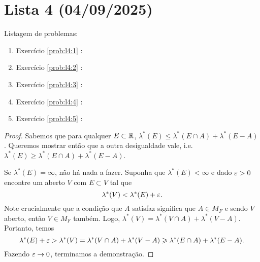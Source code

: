 \section{Lista 4 (04/09/2025)}

Listagem de problemas:
\begin{enumerate}
    \item Exercício \ref{prob:l4:1} : \checkmark
    \item Exercício \ref{prob:l4:2} : \Frowny
    \item Exercício \ref{prob:l4:3} : \Frowny
    \item Exercício \ref{prob:l4:4} : \Frowny
    \item Exercício \ref{prob:l4:5} : \Frowny
\end{enumerate}

\begin{problem}
    \label{prob:l4:1}
\end{problem}
\begin{proof}
    Sabemos que para qualquer $E \subset \mathbb{R}$, $\lambda^*(E) \leq \lambda^*(E \cap A) + \lambda^*(E - A)$.
    Queremos mostrar então que a outra desigualdade vale, i.e. $\lambda^*(E) \geq \lambda^*(E \cap A) + \lambda^*(E - A)$.
    
    Se $\lambda^*(E) = \infty$, não há nada a fazer. Suponha que $\lambda^*(E) < \infty$ e dado $\varepsilon > 0$
    encontre um aberto $V$ com $E \subset V$ tal que 
    $$\lambda^*(V) < \lambda^*(E) + \varepsilon .$$
    Note crucialmente que a condição que $A$ satisfaz significa que $A \in M_F$
    e sendo $V$ aberto, então $V \in M_F$ também. Logo, $\lambda^*(V) = \lambda^*(V \cap A) + \lambda^*(V - A)$.
    Portanto, temos 
    $$\lambda^*(E) + \varepsilon > \lambda^*(V) = \lambda^*(V \cap A) + \lambda^*(V - A) \geqslant \lambda^*(E \cap A) + \lambda^*(E - A).$$
    Fazendo $\varepsilon \rightarrow 0$, terminamos a demonstração.
\end{proof}

